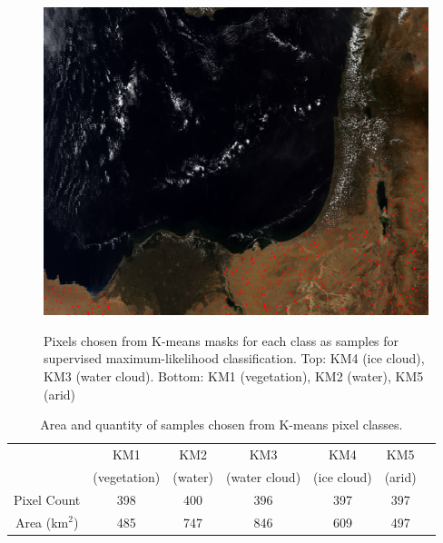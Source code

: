 \documentclass[12pt]{article}
\begin{document}
\begin{figure}[h!]
\begin{center}
{            \includegraphics[width=.3\paperwidth]{figs/masks/cmask_samples_km_KM5_TC.png}
        }
    \end{center}

    \caption{Pixels chosen from K-means masks for each class as samples for supervised maximum-likelihood classification. Top: KM4 (ice cloud), KM3 (water cloud). Bottom: KM1 (vegetation), KM2 (water), KM5 (arid)}
    \label{thresh_samples}
\end{figure}

\begin{table}[h!]
    \centering
    \begin{tabular}{c|cccccc}
        & KM1  & KM2  & KM3  & KM4  & KM5  \\
        & (vegetation) & (water) & (water cloud) & (ice cloud) & (arid) \\
    \hline
    Pixel Count & 398 & 400 & 396 & 397 & 397\\
    Area (km$^2$) & 485 & 747 & 846 & 609 & 497\\
    \end{tabular}
    \caption{Area and quantity of samples chosen from K-means pixel classes.}
    \label{sample_km_areas}
\end{table}

\clearpage
\end{document}
